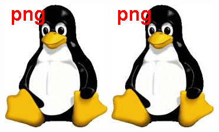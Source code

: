 \documentclass{blois}
\begin{document}
\begin{figure}
\begin{minipage}{0.33\linewidth}
\centerline{\includegraphics[width=0.7\linewidth,draft=true]{figexamp}}
\end{minipage}
\hfill
\begin{minipage}{0.32\linewidth}
\centerline{\includegraphics[width=0.7\linewidth]{figexamp}}
\end{minipage}
\hfill
\begin{minipage}{0.32\linewidth}

\end{minipage}
\end{figure}
\end{document}
